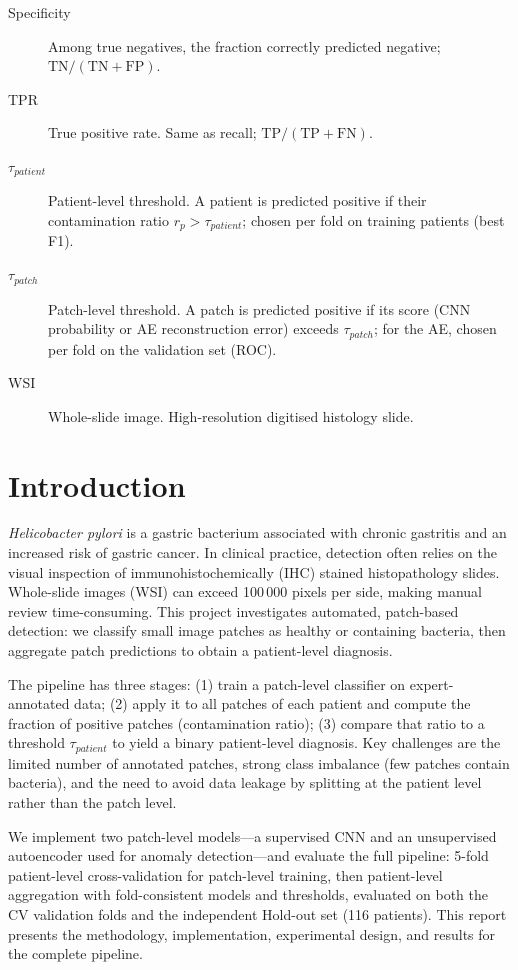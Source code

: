 \documentclass[11pt,a4paper]{article}
\begin{document}
\begin{description}
  \item[Specificity] Among true negatives, the fraction correctly predicted negative; $\mathrm{TN}/(\mathrm{TN}+\mathrm{FP})$.
  \item[TPR] True positive rate. Same as recall; $\mathrm{TP}/(\mathrm{TP}+\mathrm{FN})$.
  \item[$\tau_{patient}$] Patient-level threshold. A patient is predicted positive if their contamination ratio $r_p > \tau_{patient}$; chosen per fold on training patients (best F1).
  \item[$\tau_{patch}$] Patch-level threshold. A patch is predicted positive if its score (CNN probability or AE reconstruction error) exceeds $\tau_{patch}$; for the AE, chosen per fold on the validation set (ROC).
  \item[WSI] Whole-slide image. High-resolution digitised histology slide.
\end{description}

\newpage

\section{Introduction}
\label{sec:intro}

\textit{Helicobacter pylori} is a gastric bacterium associated with chronic gastritis and an increased risk of gastric cancer. In clinical practice, detection often relies on the visual inspection of immunohistochemically (IHC) stained histopathology slides. Whole-slide images (WSI) can exceed 100\,000 pixels per side, making manual review time-consuming. This project investigates automated, patch-based detection: we classify small image patches as healthy or containing bacteria, then aggregate patch predictions to obtain a patient-level diagnosis.

The pipeline has three stages: (1) train a patch-level classifier on expert-annotated data; (2) apply it to all patches of each patient and compute the fraction of positive patches (contamination ratio); (3) compare that ratio to a threshold $\tau_{patient}$ to yield a binary patient-level diagnosis. Key challenges are the limited number of annotated patches, strong class imbalance (few patches contain bacteria), and the need to avoid data leakage by splitting at the patient level rather than the patch level.

We implement two patch-level models---a supervised CNN and an unsupervised autoencoder used for anomaly detection---and evaluate the full pipeline: 5-fold patient-level cross-validation for patch-level training, then patient-level aggregation with fold-consistent models and thresholds, evaluated on both the CV validation folds and the independent Hold-out set (116 patients). This report presents the methodology, implementation, experimental design, and results for the complete pipeline.
\end{document}
